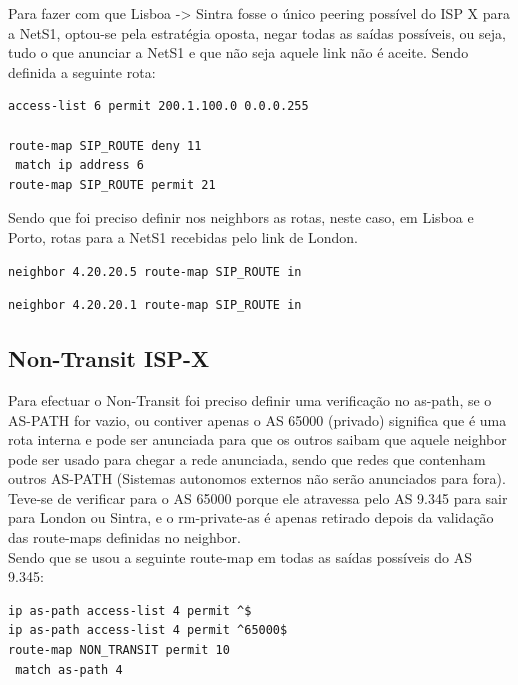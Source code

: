\documentclass[11pt,a4paper]{report}
\begin{document}
Para fazer com que Lisboa -> Sintra fosse o único peering possível do ISP X para a NetS1, optou-se pela estratégia oposta, negar todas as saídas possíveis, ou seja, tudo o que anunciar a NetS1 e que não seja aquele link não é aceite. Sendo definida a seguinte rota:\\

\begin{lstlisting}[caption=Route-map SIP\_ROUTE para cancelar rotas]
access-list 6 permit 200.1.100.0 0.0.0.255

route-map SIP_ROUTE deny 11
 match ip address 6
route-map SIP_ROUTE permit 21
\end{lstlisting}

Sendo que foi preciso definir nos neighbors as rotas, neste caso, em Lisboa e Porto, rotas para a NetS1 recebidas pelo link de London.\\

\begin{lstlisting}[caption=Cancelar rota para NetS1 recebida em Lisboa por London]
neighbor 4.20.20.5 route-map SIP_ROUTE in
\end{lstlisting}

\begin{lstlisting}[caption=Cancelar rota para NetS1 recebida no Porto por London]
neighbor 4.20.20.1 route-map SIP_ROUTE in
\end{lstlisting}

\subsection{Non-Transit ISP-X}

Para efectuar o Non-Transit foi preciso definir uma verificação no as-path, se o AS-PATH for vazio, ou contiver apenas o AS 65000 (privado) significa que é uma rota interna e pode ser anunciada para que os outros saibam que aquele neighbor pode ser usado para chegar a rede anunciada, sendo que redes que contenham outros AS-PATH (Sistemas autonomos externos não serão anunciados para fora).\\

Teve-se de verificar para o AS 65000 porque ele atravessa pelo AS 9.345 para sair para London ou Sintra, e o rm-private-as é apenas retirado depois da validação das route-maps definidas no neighbor.\\

Sendo que se usou a seguinte route-map em todas as saídas possíveis do AS 9.345:

\begin{lstlisting}[caption=Tornar ISP X num AS Non-Transit]
ip as-path access-list 4 permit ^$
ip as-path access-list 4 permit ^65000$
route-map NON_TRANSIT permit 10
 match as-path 4
\end{lstlisting}
\end{document}
